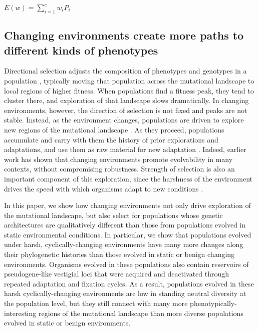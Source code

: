 \documentclass[letterpaper]{article}
\begin{document}
\begin{center}
$E(w) = \displaystyle\sum_{i=1}^{e} w_i P_i$
\end{center}

\subsection{Changing environments create more paths to different kinds of phenotypes}
Directional selection adjusts the composition of phenotypes and genotypes in a population \citep{wright_evolution_1931}, typically moving that population across the mutational landscape to local regions of higher fitness. When populations find a fitness peak, they tend to cluster there, and
exploration of that landscape slows dramatically.
In changing environments, however, the direction of selection is not fixed and peaks are not stable.  Instead, as the environment changes, populations are driven to explore new regions of the mutational landscape \citep{kashtan_varying_2007,connelly_negative_2015}. As they proceed, populations accumulate and carry with them the history of prior explorations and adaptations, and use them as raw material for new adaptation \citep{mcclintock_significance_1993}. Indeed, earlier work has shown that changing environments promote evolvability in many contexts, without compromising robustness\citep{crombach_evolution_2008,wilke_evolution_2001}. Strength of selection is also an important component of this exploration, since the harshness of the environment drives the speed with which organisms adapt to new conditions \citep{goddard_sex_2005}.

In this paper, we show how changing environments not only drive exploration of the mutational landscape, but also select for populations whose genetic architectures are qualitatively different than those from populations evolved in static environmental conditions. In particular, we show that populations evolved under harsh, cyclically-changing environments have many more changes along their phylogenetic histories than those evolved in static or benign changing environments. Organisms evolved in these populations also contain reservoirs of pseudogene-like vestigial loci that were acquired and deactivated through repeated adaptation and fixation cycles. As a result, populations evolved in these harsh cyclically-changing environments are low in standing neutral diversity at the population level, but they still connect with many more phenotypically-interesting regions of the mutational landscape than more diverse populations evolved in static or benign environments.
\end{document}

